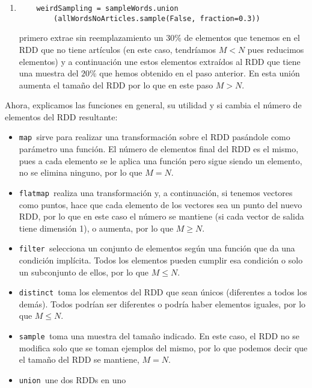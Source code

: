 \documentclass[11pt]{article}
\def\inline{\lstinline[basicstyle=\ttfamily,keywordstyle={}]}
\begin{document}
{{\begin{enumerate}
\item  \begin{verbatim}
    weirdSampling = sampleWords.union
        (allWordsNoArticles.sample(False, fraction=0.3))
\end{verbatim} 
primero extrae sin reemplazamiento un $30\%$ de elementos que tenemos en el RDD que no tiene artículos (en este caso, tendríamos $M < N$ pues reducimos elementos) y a continuación une estos elementos extraídos al RDD que tiene una muestra del $20\%$ que hemos obtenido en el paso anterior. En esta unión aumenta el tamaño del RDD por lo que en este paso $M > N$.

\end{enumerate}
Ahora, explicamos las funciones en general, su utilidad y si cambia el número de elementos del RDD resultante:

\begin{itemize}

\item  \inline{map }sirve para realizar una transformación sobre el RDD pasándole como parámetro una función. El número de elementos final del RDD es el mismo, pues a cada elemento se le aplica una función pero sigue siendo un elemento, no se elimina ninguno, por lo que $M=N$.

\item  \inline{flatmap }realiza una transformación y, a continuación, si tenemos vectores como puntos, hace que cada elemento de los vectores sea un punto del nuevo RDD, por lo que en este caso el número se mantiene (si cada vector de salida tiene dimensión 1), o aumenta, por lo que $M \geq N$.

\item  \inline{filter }selecciona un conjunto de elementos según una función que da una condición implícita. Todos los elementos pueden cumplir esa condición o solo un subconjunto de ellos, por lo que $M \leq N$.

\item  \inline{distinct }toma los elementos del RDD que sean únicos (diferentes a todos los demás). Todos podrían ser diferentes o podría haber elementos iguales, por lo que $M \leq N$.

\item  \inline{sample }toma una muestra del tamaño indicado. En este caso, el RDD no se modifica solo que se toman ejemplos del mismo, por lo que podemos decir que el tamaño del RDD se mantiene, $M=N$.

\item  \inline{union }une dos RDDs en uno


\end{itemize}}}
\end{document}
